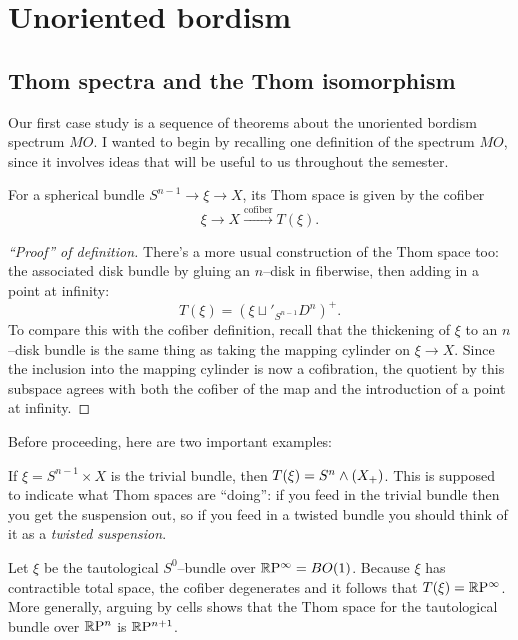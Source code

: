 
\chapter{Unoriented bordism}\label{UnorientedBordismChapter}




\section{Thom spectra and the Thom isomorphism}\label{LectureThomSpectra}

Our first case study is a sequence of theorems about the unoriented bordism spectrum $MO$.  I wanted to begin by recalling one definition of the spectrum $MO$, since it involves ideas that will be useful to us throughout the semester.

\begin{definition}
For a spherical bundle $S^{n-1} \to \xi \to X$, its Thom space is given by the cofiber \[\xi \to X \xrightarrow{\text{cofiber}} T(\xi).\]
\end{definition}
\begin{proof}[``Proof'' of definition]
There's a more usual construction of the Thom space too: the associated disk bundle by gluing an $n$--disk in fiberwise, then adding in a point at infinity: \[T(\xi) = (\xi \sqcup'_{S^{n-1}} D^n)^+.\]  To compare this with the cofiber definition, recall that the thickening of $\xi$ to an $n$--disk bundle is the same thing as taking the mapping cylinder on $\xi \to X$.  Since the inclusion into the mapping cylinder is now a cofibration, the quotient by this subspace agrees with both the cofiber of the map and the introduction of a point at infinity.
\end{proof}

Before proceeding, here are two important examples:
\begin{example}\label{TrivialBundleThomExample}
If $\xi = S^{n-1} \times X$ is the trivial bundle, then $T(\xi) = S^n \wedge (X_+)$.  This is supposed to indicate what Thom spaces are ``doing'': if you feed in the trivial bundle then you get the suspension out, so if you feed in a twisted bundle you should think of it as a \textit{twisted suspension}.
\end{example}

\begin{example}\label{RPnThomExample}
Let $\xi$ be the tautological $S^0$--bundle over $\mathbb R\mathrm P^\infty = BO(1)$.  Because $\xi$ has contractible total space, the cofiber degenerates and it follows that $T(\xi) = \mathbb R\mathrm P^\infty$. More generally, arguing by cells shows that the Thom space for the tautological bundle over $\mathbb R\mathrm P^n$ is $\mathbb R\mathrm P^{n+1}$.
\end{example}

